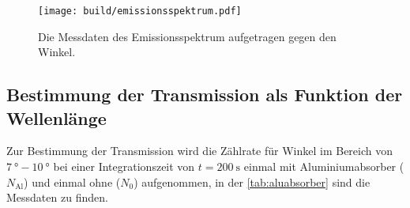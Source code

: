   \begin{figure}
    \centering
    \texttt{[image: build/emissionsspektrum.pdf]}
    \caption{Die Messdaten des Emissionsspektrum aufgetragen gegen den Winkel.}
    \label{fig:emissionsspektrum}
  \end{figure}

\subsection{Bestimmung der Transmission als Funktion der Wellenlänge}
\label{subsec:T(lambda)}

  Zur Bestimmung der Transmission wird die Zählrate für Winkel im Bereich von $\SI{7}{\degree}-\SI{10}{\degree}$ bei einer Integrationszeit von 
  $t = \SI{200}{\second}$ einmal mit Aluminiumabsorber ($N_{\text{Al}}$) und einmal ohne ($N_0$) aufgenommen, in der \autoref{tab:aluabsorber} sind die Messdaten 
  zu finden.

